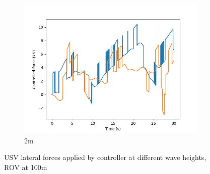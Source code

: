 \documentclass[class=article, crop=false]{standalone}
\begin{document}
\begin{figure}
\begin{subfigure}[b]{0.48\textwidth}
        \includegraphics{scenario1/rov-100m/2.0m/usv_forces}
        \caption{2m}
        \label{}
    \end{subfigure}

    \caption{USV lateral forces applied by controller at different wave heights, ROV at 100m}
\end{figure}
\FloatBarrier
\end{document}
